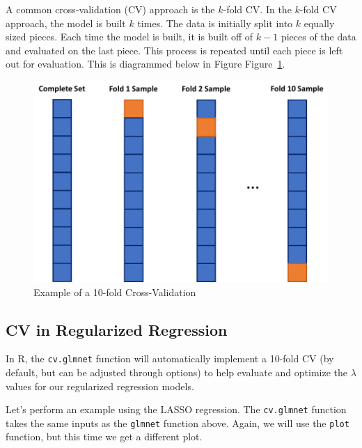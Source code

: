 \documentclass[
  letterpaper,
  DIV=11,
  numbers=noendperiod]{scrreprt}
\begin{document}
A common cross-validation (CV) approach is the \(k\)-fold CV. In the
\(k\)-fold CV approach, the model is built \(k\) times. The data is
initially split into \(k\) equally sized pieces. Each time the model is
built, it is built off of \(k-1\) pieces of the data and evaluated on
the last piece. This process is repeated until each piece is left out
for evaluation. This is diagrammed below in Figure Figure~\ref{fig-kCV}.

\begin{figure}

{\centering \includegraphics{./img/kCV.png}

}

\caption{\label{fig-kCV}Example of a 10-fold Cross-Validation}

\end{figure}

\hypertarget{cv-in-regularized-regression}{%
\subsection{CV in Regularized
Regression}\label{cv-in-regularized-regression}}

In R, the \texttt{cv.glmnet} function will automatically implement a
10-fold CV (by default, but can be adjusted through options) to help
evaluate and optimize the \(\lambda\) values for our regularized
regression models.

Let's perform an example using the LASSO regression. The
\texttt{cv.glmnet} function takes the same inputs as the \texttt{glmnet}
function above. Again, we will use the \texttt{plot} function, but this
time we get a different plot.
\end{document}
